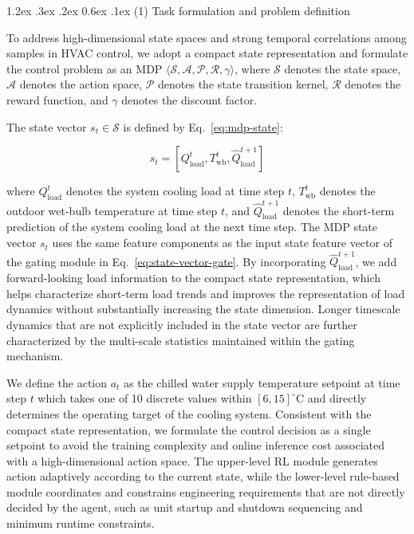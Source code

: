 ﻿\documentclass[preprint,12pt,number]{elsarticle}
\makeatletter
\renewcommand\paragraph{\@startsection{paragraph}{4}{\z@}%
  {1.2ex \@plus .3ex \@minus .2ex}%
  {0.6ex \@plus .1ex}%
  {\normalfont\normalsize}}
\makeatother
\begin{document}
\paragraph{(1) Task formulation and problem definition}\label{task-formulation-and-problem-definition}

To address high-dimensional state spaces and strong temporal correlations among samples in HVAC control, we adopt a compact state representation and formulate the control problem as an MDP \(\langle \mathcal{S}, \mathcal{A}, \mathcal{P}, \mathcal{R}, \gamma \rangle\), where \(\mathcal{S}\) denotes the state space, \(\mathcal{A}\) denotes the action space, \(\mathcal{P}\) denotes the state transition kernel, \(\mathcal{R}\) denotes the reward function, and \(\gamma\) denotes the discount factor.

The state vector \(s_t \in \mathcal{S}\) is defined by Eq.~\eqref{eq:mdp-state}:

\[s_t = [Q_{\mathrm{load}}^t, T_{\mathrm{wb}}^t, \hat{Q}_{\mathrm{load}}^{t+1}] \tag{17}\label{eq:mdp-state}\]

\noindent where \(Q_{\mathrm{load}}^t\) denotes the system cooling load at time step \(t\), \(T_{\mathrm{wb}}^t\) denotes the outdoor wet-bulb temperature at time step \(t\), and \(\hat{Q}_{\mathrm{load}}^{t+1}\) denotes the short-term prediction of the system cooling load at the next time step. The MDP state vector \(s_t\) uses the same feature components as the input state feature vector of the gating module in Eq.~\eqref{eq:state-vector-gate}. By incorporating \(\hat{Q}_{\mathrm{load}}^{t+1}\), we add forward-looking load information to the compact state representation, which helps characterize short-term load trends and improves the representation of load dynamics without substantially increasing the state dimension. Longer timescale dynamics that are not explicitly included in the state vector are further characterized by the multi-scale statistics maintained within the gating mechanism.

We define the action \(a_t\) as the chilled water supply temperature setpoint at time step \(t\) which takes one of 10 discrete values within \([6,15]^{\circ}\mathrm{C}\) and directly determines the operating target of the cooling system. Consistent with the compact state representation, we formulate the control decision as a single setpoint to avoid the training complexity and online inference cost associated with a high-dimensional action space. The upper-level RL module generates action adaptively according to the current state, while the lower-level rule-based module coordinates and constrains engineering requirements that are not directly decided by the agent, such as unit startup and shutdown sequencing and minimum runtime constraints.
\end{document}
